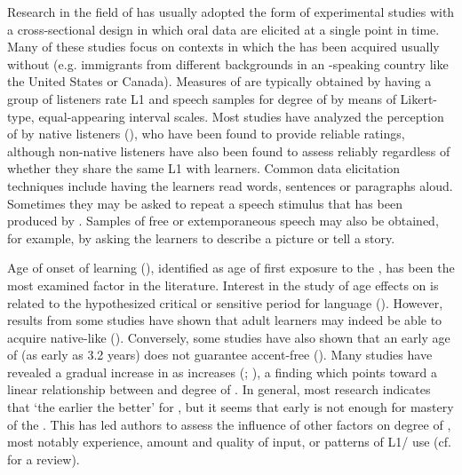 \documentclass[output=paper]{langsci/langscibook}
\begin{document}
Research in the field of  has usually adopted the form of experimental studies with a cross-sectional design in which oral data are elicited at a single point in time. Many of these studies focus on  contexts in which the  has been acquired usually without  (e.g. immigrants from different backgrounds in an -speaking country like the United States or Canada). Measures of  are typically obtained by having a group of listeners rate L1 and  speech samples for degree of  by means of Likert-type, equal-appearing interval scales. Most studies have analyzed the perception of  by native listeners (), who have been found to provide reliable  ratings, although non-native listeners have also been found to assess  reliably regardless of whether they share the same L1 with learners. Common data elicitation techniques include having the  learners read words, sentences or paragraphs aloud. Sometimes they may be asked to repeat a speech stimulus that has been produced by . Samples of free or extemporaneous speech may also be obtained, for example, by asking the learners to describe a picture or tell a story. 

\newpage 
Age of onset of learning (), identified as age of first exposure to the , has been the most examined factor in the  literature. Interest in the study of age effects on   is related to the hypothesized critical or sensitive period for language  (\citealt{Lenneberg1967,Scovel1988}). However, results from some studies have shown that adult learners may indeed be able to acquire native-like  (\citealt{BongaertsEtAl1995,FlegeEtAl1995,BongaertsEtAl1997}). Conversely, some studies have also shown that an early age of   (as early as 3.2 years) does not guarantee accent-free  (\citealt{FlegeEtAl1997}). Many studies have revealed a gradual increase in  as  increases (\citealt{Flege1988}; \citealt{FlegeFletcher1992}), a finding which points toward a linear relationship between  and degree of . In general, most research indicates that ‘the earlier the better’ for  , but it seems that early   is not enough for mastery of the . This has led authors to assess the influence of other factors on degree of , most notably  experience, amount and quality of  input, or patterns of L1/ use (cf. \citealt{PiskeEtAl2001} for a review). 
\end{document}
